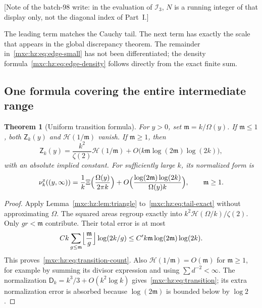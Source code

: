 \documentclass[11pt]{article}
\numberwithin{equation}{section}
\newtheorem{theorem}{Theorem}[section]
\theoremstyle{definition}
\theoremstyle{remark}
\newcommand{\hznu}{\nu^{\mathrm z}}
\begin{document}
[Note of the batch-98 write: in the evaluation of $\mathcal I_3$, $N$ is a
running integer of that display only, not the diagonal index of Part~I.]

The leading term matches the Cauchy tail. The next term has exactly the
scale that appears in the global discrepancy theorem. The remainder
in~\eqref{mxc:hz:eq:edge-small} has not been differentiated; the density
formula~\eqref{mxc:hz:eq:edge-density} follows directly from the exact
finite sum.

\subsection{One formula covering the entire intermediate range}

\begin{theorem}[Uniform transition formula]\label{mxc:hz:thm:transition}
For $y>0$, set $\mathfrak m=k/\Omega(y)$. If $\mathfrak m\le1$, both
$\mathsf Z_k(y)$ and $\mathcal H(1/\mathfrak m)$ vanish. If
$\mathfrak m\ge1$, then
\begin{equation}\label{mxc:hz:eq:transition-count}
 \mathsf Z_k(y)=\frac{k^2}{\zeta(2)}\mathcal H(1/\mathfrak m)
       +O\bigl(k\mathfrak m\log(2\mathfrak m)\log(2k)\bigr),
\end{equation}
with an absolute implied constant. For sufficiently large $k$, its
normalized form is
\begin{equation}\label{mxc:hz:eq:transition}
 \hznu_k((y,\infty))
 =\frac1k\Xi\Bigl(\frac{\Omega(y)}{2\pi k}\Bigr)
  +O\Bigl(\frac{\log(2\mathfrak m)\log(2k)}{\Omega(y)k}\Bigr),
 \qquad \mathfrak m\ge1.
\end{equation}
\end{theorem}

\begin{proof}
Apply Lemma~\ref{mxc:hz:lem:triangle} to~\eqref{mxc:hz:eq:tail-exact}
without approximating $\Omega$. The squared areas regroup exactly into
$k^2\mathcal H(\Omega/k)/\zeta(2)$. Only $gr<\mathfrak m$ contribute.
Their total error is at most
\[
 Ck\sum_{g\le\mathfrak m}\Bigl\lfloor\frac{\mathfrak m}g\Bigr\rfloor\log(2k/g)
 \le C'k\mathfrak m\log(2\mathfrak m)\log(2k).
\]
This proves~\eqref{mxc:hz:eq:transition-count}. Also
$\mathcal H(1/\mathfrak m)=O(\mathfrak m)$ for $\mathfrak m\ge1$, for example
by summing its divisor expression and using $\sum d^{-2}<\infty$. The
normalization $\mathsf D_k=k^3/3+O(k^2\log k)$
gives~\eqref{mxc:hz:eq:transition}; its extra normalization error is
absorbed because $\log(2\mathfrak m)$ is bounded below by $\log2$.
\end{proof}
\end{document}
